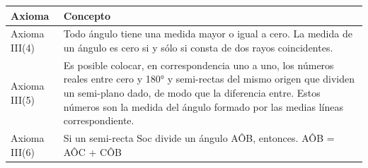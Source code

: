\documentclass[12pt a4paper]{article}
\begin{document}
\begin{center}
    \begin{tabular}{|m{3cm}|m{10cm}|}\hline
\bf Axioma & \bf Concepto \\
\hline
Axioma III(4) & Todo ángulo tiene una medida mayor o igual a cero.
La medida de un ángulo es cero si y sólo si consta de
dos rayos coincidentes. \\
\hline
Axioma III(5) & Es posible colocar, en correspondencia uno a uno, los números reales entre cero y 180° y semi-rectas del mismo origen que dividen un semi-plano dado, de modo que la diferencia entre. Estos números son la medida del ángulo formado por las medias líneas correspondiente. \\
\hline
Axioma III(6) & Si un semi-recta Soc divide un ángulo AÔB, entonces.
AÔB = AÔC + CÔB \\
\hline
\end{tabular}
\end{center}
\end{document}

